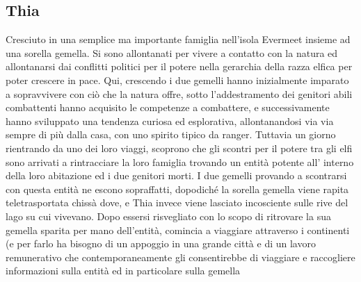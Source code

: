 \documentclass{article}
\begin{document}
          \subsection{Thia}
Cresciuto in una semplice ma importante famiglia nell'isola Evermeet insieme ad una sorella gemella. Si sono allontanati per vivere a contatto con la natura ed allontanarsi dai conflitti politici per il potere nella gerarchia della razza elfica per poter crescere in pace. Qui, crescendo i due gemelli hanno inizialmente imparato a sopravvivere con ciò che la natura offre, sotto l'addestramento dei genitori abili combattenti hanno acquisito le competenze a combattere, e successivamente hanno sviluppato una tendenza curiosa ed esplorativa, allontanandosi via via sempre di più dalla casa, con uno spirito tipico da ranger. Tuttavia un giorno rientrando da uno dei loro viaggi, scoprono che gli scontri per il potere tra gli elfi sono arrivati a rintracciare la loro famiglia trovando un entità potente all' interno della loro abitazione ed i due genitori morti. I due gemelli provando a scontrarsi con questa entità ne escono sopraffatti, dopodiché la sorella gemella viene rapita teletrasportata chissà dove, e Thia invece viene lasciato incosciente sulle rive del lago su cui vivevano. Dopo essersi risvegliato con lo scopo di ritrovare la sua gemella sparita per mano dell'entità, comincia a viaggiare attraverso i continenti (e per farlo ha bisogno di un appoggio in una grande città e di un lavoro remunerativo che contemporaneamente gli consentirebbe di viaggiare e raccogliere informazioni sulla entità ed in particolare sulla gemella
\end{document}
